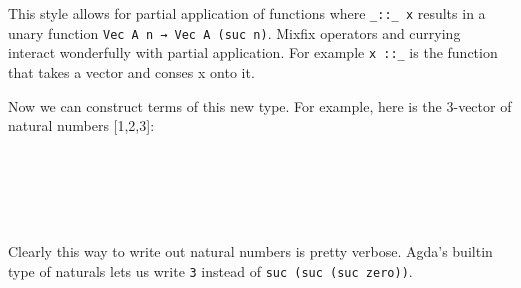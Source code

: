 This style allows for partial application of functions where \texttt{\_::\_~x} results
in a unary function \texttt{Vec~A~n~→~Vec~A~(suc~n)}.
Mixfix operators and currying interact wonderfully with partial application. For example
\texttt{x~::\_} is the function that takes a vector and conses x onto it.

Now we can construct terms of this new type.
For example, here is the 3-vector of natural numbers [1,2,3]:
\begin{code}%
\>[0]\AgdaSpace{}%
\AgdaSymbol{:}\AgdaSpace{}%
\AgdaSpace{}%
\AgdaSpace{}%
\AgdaSymbol{(}\AgdaSpace{}%
\AgdaSymbol{(}\AgdaSpace{}%
\AgdaSymbol{(}\AgdaSpace{}%
\AgdaSymbol{)))}\<%
\\
\>[0]\AgdaSpace{}%
\AgdaSymbol{=}\AgdaSpace{}%
\AgdaSpace{}%
\<%
\\
\>[0][@{}l@{\AgdaIndent{0}}]%
\>[2]\AgdaOperator{\AgdaInductiveConstructor{::}}\AgdaSpace{}%
\AgdaSymbol{(}\AgdaSpace{}%
\AgdaSymbol{(}\AgdaSpace{}%
\AgdaSymbol{)}\<%
\\
\>[2][@{}l@{\AgdaIndent{0}}]%
\>[4]\AgdaOperator{\AgdaInductiveConstructor{::}}\AgdaSpace{}%
\AgdaSymbol{(}\AgdaSpace{}%
\AgdaSymbol{(}\AgdaSpace{}%
\AgdaSymbol{(}\AgdaSpace{}%
\AgdaSymbol{))}\<%
\\
\>[4][@{}l@{\AgdaIndent{0}}]%
\>[6]\AgdaOperator{\AgdaInductiveConstructor{::}}\AgdaSpace{}%
\AgdaInductiveConstructor{[]}\AgdaSymbol{))}\<%
\end{code}
Clearly this way to write out natural numbers is pretty verbose.
Agda's builtin type of naturals lets us write \texttt{3} instead of \texttt{suc (suc (suc zero))}.

